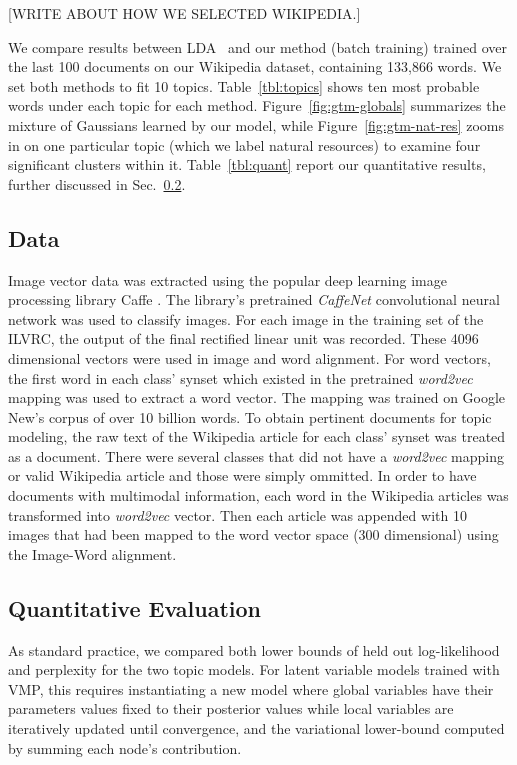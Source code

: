 \documentclass[11pt]{article}
\begin{document}
[WRITE ABOUT HOW WE SELECTED WIKIPEDIA.]

We compare results between LDA~\cite{Blei03} and our method (batch training) trained over the last 100 documents on our Wikipedia dataset, containing 133,866 words. We set both methods to fit 10 topics. Table~\ref{tbl:topics} shows ten most probable words under each topic for each method. Figure~\ref{fig:gtm-globals} summarizes the mixture of Gaussians learned by our model, while Figure~\ref{fig:gtm-nat-res} zooms in on one particular topic (which we label natural resources) to examine four significant clusters within it. Table~\ref{tbl:quant} report our quantitative results, further discussed in Sec.~\ref{sec:quant}.

\subsection{Data}
\label{sec:data}
Image vector data was extracted using the popular deep learning image processing library Caffe \cite{Jia14}. The library's pretrained \textit{CaffeNet} convolutional neural network was used to classify images. For each image in the training set of the ILVRC, the output of the final rectified linear unit was recorded. These 4096 dimensional vectors were used in image and word alignment. For word vectors, the first word in each class' synset which existed in the pretrained \textit{word2vec} \cite{Mikolov13a} mapping was used to extract a word vector. The mapping was trained on Google New's corpus of over 10 billion words. To obtain pertinent documents for topic modeling, the raw text of the Wikipedia article for each class' synset was treated as a document. There were several classes that did not have a \textit{word2vec} mapping or valid Wikipedia article and those were simply ommitted. In order to have documents with multimodal information, each word in the Wikipedia articles was transformed into \textit{word2vec} vector. Then each article was appended with 10 images that had been mapped to the word vector space (300 dimensional) using the Image-Word alignment.

\subsection{Quantitative Evaluation}
\label{sec:quant}
As standard practice, we compared both lower bounds of held out log-likelihood and perplexity for the two topic models. For latent variable models trained with VMP, this requires instantiating a new model where global variables have their parameters values fixed to their posterior values while local variables are iteratively updated until convergence, and the variational lower-bound computed by summing each node's contribution.
\end{document}
